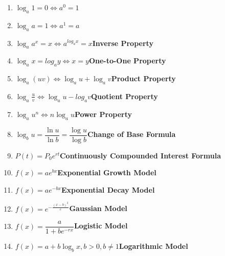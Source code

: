 \documentclass{amsart}
\begin{document}
  \begin{large}
  
    \begin{enumerate}
        \item $\log_a 1=0\Leftrightarrow a^0=1$\bigskip
        \item $\log_a a=1\Leftrightarrow a^1=a$\bigskip
        \item $\log_a a^x=x\Leftrightarrow a^{log_a x} = x$\hfill\textbf{Inverse Property}\bigskip
        \item $\log_a x = log_a y \Leftrightarrow x=y$\hfill\textbf{One-to-One Property}\bigskip
        \item $\log_a(uv)\Leftrightarrow \log_au+\log_av$\hfill\textbf{Product Property}\bigskip
        \item $\log_a\frac{u}{v}\Leftrightarrow \log_au-log_av$\hfill\textbf{Quotient Property}\bigskip
        \item $\log_au^n\Leftrightarrow n\log_au$\hfill\textbf{Power Property}\bigskip
        \item $\log_bu=\dfrac{\ln u}{\ln b}=\dfrac{\log u}{\log b}$\hfill\textbf{Change of Base Formula}\bigskip
        \item $P(t)=P_{0}e^{rt}$\hfill\textbf{Continuously Compounded Interest Formula}\bigskip
        \item $f(x)=ae^{bx}$\hfill\textbf{Exponential Growth Model}\bigskip
        \item $f(x)=ae^{-bx}$\hfill\textbf{Exponential Decay Model}\bigskip
        \item $f(x)=e^{-\frac{(x-b)^2}{c}}$\hfill\textbf{Gaussian Model}\bigskip
        \item $f(x)=\dfrac{a}{1+be^{-rx}}$\hfill\textbf{Logistic Model}\bigskip
        \item $f(x)=a+b\log_bx, b>0, b\neq 1$\hfill\textbf{Logarithmic Model}\bigskip
    \end{enumerate}
  \end{large}
\end{document}
